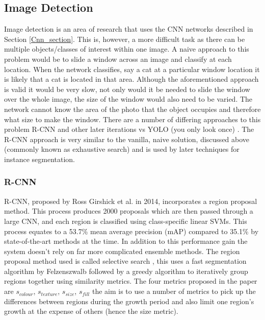 \documentclass[11pt,twoside]{report}
\begin{document}
\subsection{Image Detection} \label{Image_det}
Image detection is an area of research that uses the CNN networks described in Section \ref{Cnn_section}. This is, however, a more difficult task as there can be multiple objects/classes of interest within one image. A naive approach to this problem would be to slide a window across an image and classify at each location. When the network classifies, say a cat at a particular window location it is likely that a cat is located in that area.
\newline \newline
Although the aforementioned approach is valid it would be very slow, not only would it be needed to slide the window over the whole image, the size of the window would also need to be varied. The network cannot know the area of the photo that the object occupies and therefore what size to make the window. There are a number of differing approaches to this problem R-CNN \cite{DBLP:journals/corr/GirshickDDM13} and other later iterations vs YOLO (you only look once) \cite{DBLP:journals/corr/RedmonDGF15}. The R-CNN approach is very similar to the vanilla, naive solution, discussed above (commonly known as exhaustive search) and is used by later techniques for instance segmentation.


\subsubsection{R-CNN} \label{rcnn}
R-CNN, proposed by Ross Girshick et al. \cite{DBLP:journals/corr/GirshickDDM13} in 2014, incorporates a region proposal method. This process produces 2000 proposals which are then passed through a large CNN, and each region is classified using class-specific linear SVMs. This process equates to a 53.7\% mean average precision (mAP) compared to 35.1\% by state-of-the-art methods at the time. In addition to this performance gain the system doesn't rely on far more complicated ensemble methods.
\newline \newline
The region proposal method used is called selective search \cite{Uijlings2013}, this uses a fast segmentation algorithm by Felzenszwalb \cite{Felzenszwalb2004} followed by a greedy algorithm to iteratively group regions together using similarity metrics. The four metrics proposed in the paper are $s_{colour}$, $s_{texture}$, $s_{size}$, $s_{fill}$  the aim is to use a number of metrics to pick up the differences between regions during the growth period and also limit one region's growth at the expense of others (hence the size metric).
\end{document}
